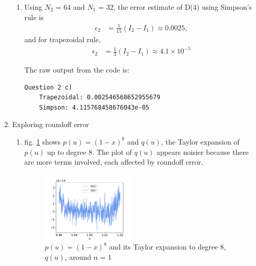 \documentclass{article}
\begin{document}
\begin{enumerate}
\begin{enumerate}

    \item Using $N_2$ = 64 and $N_1$ = 32, the error estimate of D(4) using Simpson's rule is 
        \begin{align*}
            \epsilon_2& = \frac{1}{15}(I_2-I_1) \approx 0.0025,
        \end{align*}
    and for trapezoidal rule, 
        \begin{align*}
            \epsilon_2 &= \frac{1}{3}(I_2-I_1) \approx 4.1\times 10^{-5}
        \end{align*}

    The raw output from the code is:

    \begin{verbatim}
Question 2 c)
    Trapezoidal: 0.002546568652955679
    Simpson: 4.115768458676043e-05
    \end{verbatim}

\end{enumerate}

\item Exploring roundoff error
\begin{enumerate}
    \item fig. \ref{fig:3a} shows $p(u)=(1-x)^8$ and $q(u)$, the Taylor expansion of $p(u)$ up to degree 8. The plot of $q(u)$ appears noisier because there are more terms involved, each affected by roundoff error.
    \begin{figure}[h]
        \centering
        \includegraphics[width=0.45\textwidth]{3a.pdf}
        \caption{$p(u) = (1-x)^8$ and its Taylor expansion to degree 8, $q(u)$, around u = 1}
        \label{fig:3a}
    \end{figure} 


\end{enumerate}
\end{enumerate}
\end{document}
